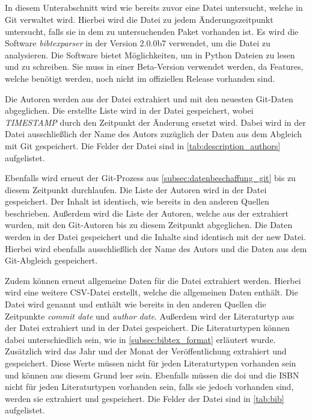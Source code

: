 \subsection{}
\label{subsec:datenbeschaffung_bibtex}
In diesem Unterabschnitt wird wie bereits zuvor eine Datei untersucht, welche in Git verwaltet wird.
Hierbei wird die  Datei zu jedem Änderungszeitpunkt untersucht, falls sie in dem zu untersuchenden Paket vorhanden ist.
Es wird die Software \emph{bibtexparser} in der Version 2.0.0b7 verwendet, um die  Datei zu analysieren.
Die Software bietet Möglichkeiten, um in Python  Dateien zu lesen und zu schreiben.
Sie muss in einer Beta-Version verwendet werden, da Features, welche benötigt werden, noch nicht im offiziellen Release vorhanden sind.

Die Autoren werden aus der  Datei extrahiert und mit den neuesten Git-Daten abgeglichen.
Die erstellte Liste wird in der Datei  gespeichert, wobei \emph{TIMESTAMP} durch den Zeitpunkt der Änderung ersetzt wird.
Dabei wird in der Datei ausschließlich der Name des Autors zuzüglich der Daten aus dem Abgleich mit Git gespeichert.
Die Felder der Datei sind in \autoref{tab:description_authors} aufgelistet.

Ebenfalls wird erneut der Git-Prozess aus \autoref{subsec:datenbeschaffung_git} bis zu diesem Zeitpunkt durchlaufen.
Die Liste der Autoren wird in der Datei  gespeichert.
Der Inhalt ist identisch, wie bereits in den anderen Quellen beschrieben.
Außerdem wird die Liste der Autoren, welche aus der  extrahiert wurden, mit den Git-Autoren bis zu diesem Zeitpunkt abgeglichen.
Die Daten werden in der Datei  gespeichert und die Inhalte sind identisch mit der \glqq new\grqq{} Datei.
Hierbei wird ebenfalls ausschließlich der Name des Autors und die Daten aus dem Git-Abgleich gespeichert.

Zudem können erneut allgemeine Daten für die  Datei extrahiert werden.
Hierbei wird eine weitere CSV-Datei erstellt, welche die allgemeinen Daten enthält.
Die Datei wird  genannt und enthält wie bereits in den anderen Quellen die Zeitpunkte \emph{commit date} und \emph{author date}.
Außerdem wird der Literaturtyp aus der Datei extrahiert und in der Datei gespeichert.
Die Literaturtypen können dabei unterschiedlich sein, wie in \autoref{subsec:bibtex_format} erläutert wurde.
Zusätzlich wird das Jahr und der Monat der Veröffentlichung extrahiert und gespeichert.
Diese Werte müssen nicht für jeden Literaturtypen vorhanden sein und können aus diesem Grund leer sein.
Ebenfalls müssen die \gls{doi} und die ISBN nicht für jeden Literaturtypen vorhanden sein, falls sie jedoch vorhanden sind, werden sie extrahiert und gespeichert.
Die Felder der Datei sind in \autoref{tab:bib} aufgelistet.

